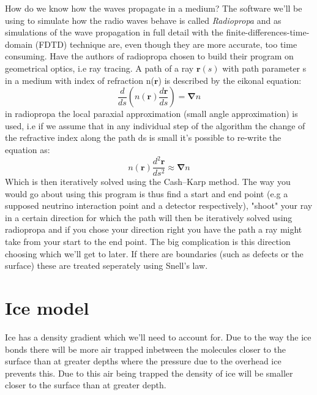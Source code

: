 \documentclass[11pt,a4paper,faculty=we,language=en,doctype=report]{cls/ugent-doc}
\begin{document}
How do we know how the waves propagate in a medium?  The software we'll be
using to simulate how the radio waves behave is called \textit{Radiopropa}
\cite{Winchen_2019} and as  simulations of the wave propagation in full detail
with the finite-differences-time-domain (FDTD) technique \cite{1138693} are,
even though they are more accurate, too time consuming. Have the authors of
radiopropa chosen to build their program on geometrical optics, i.e ray
tracing. A path of a ray $\mathbf{r}(s)$ with path parameter s in a medium
with index of refraction n($\mathbf{r}$) is described by the eikonal
equation\cite{herman2019treatise}:
\begin{equation}
	\frac{d}{ds}\left(n(\mathbf{r})\frac{d\mathbf{r}}{ds}\right) = \mathbf{\nabla} n
\end{equation}
in radiopropa the local paraxial approximation (small angle approximation) is
used, i.e if we assume that in any individual step of the algorithm the change
of the refractive index along the path ds is small it's possible to re-write
the equation as:
\begin{equation}
	n(\mathbf{r})\frac{d^2\mathbf{r}}{ds^2} \approx \mathbf{\nabla} n
	\label{eqn:radiopropaformula}
\end{equation}
Which is then iteratively solved using the Cash–Karp method.  The way you would
go about using this program is thus find a start and end point (e.g a supposed
neutrino interaction point and a detector respectively), "shoot" your ray in a
certain direction for which the path will then be iteratively solved using
radiopropa and if you chose your direction right you have the path a ray might
take from your start to the end point.  The big complication is this direction
choosing which we'll get to later.  If there are boundaries (such as defects or
the surface) these are treated seperately using Snell's law. 
\section{Ice model}
\label{section:Ice Model}
Ice has a density gradient which we'll need to account for. Due to the way the
ice bonds there will be more air trapped inbetween the molecules closer to the
surface than at greater depths where the pressure due to the overhead ice
prevents this.  Due to this air being trapped the density of ice will be
smaller closer to the surface than at greater depth.  
\end{document}
